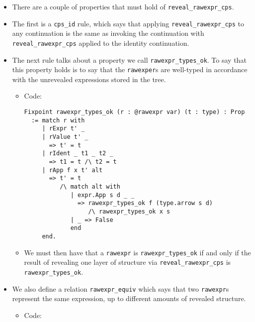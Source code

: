\begin{itemize}
\begin{itemize}
\begin{itemize}
      \begin{itemize}
      \tightlist
      \item
        There are a couple of properties that must hold of
        \texttt{reveal\_rawexpr\_cps}.
      \item
        The first is a \texttt{cps\_id} rule, which says that applying
        \texttt{reveal\_rawexpr\_cps} to any continuation is the same as
        invoking the continuation with \texttt{reveal\_rawexpr\_cps}
        applied to the identity continuation.
      \item
        The next rule talks about a property we call
        \texttt{rawexpr\_types\_ok}. To say that this property holds is
        to say that the \texttt{rawexper}s are well-typed in accordance
        with the unrevealed expressions stored in the tree.

        \begin{itemize}
        \item
          Code:

\begin{verbatim}
Fixpoint rawexpr_types_ok (r : @rawexpr var) (t : type) : Prop
  := match r with
     | rExpr t' _
     | rValue t' _
       => t' = t
     | rIdent _ t1 _ t2 _
       => t1 = t /\ t2 = t
     | rApp f x t' alt
       => t' = t
          /\ match alt with
             | expr.App s d _ _
               => rawexpr_types_ok f (type.arrow s d)
                  /\ rawexpr_types_ok x s
             | _ => False
             end
     end.
\end{verbatim}
        \item
          We must then have that a \texttt{rawexpr} is
          \texttt{rawexpr\_types\_ok} if and only if the result of
          revealing one layer of structure via
          \texttt{reveal\_rawexpr\_cps} is \texttt{rawexpr\_types\_ok}.
        \end{itemize}
      \item
        We also define a relation \texttt{rawexpr\_equiv} which says
        that two \texttt{rawexpr}s represent the same expression, up to
        different amounts of revealed structure.

        \begin{itemize}
        \item
          Code:


\end{itemize}
\end{itemize}
\end{itemize}
\end{itemize}
\end{itemize}

